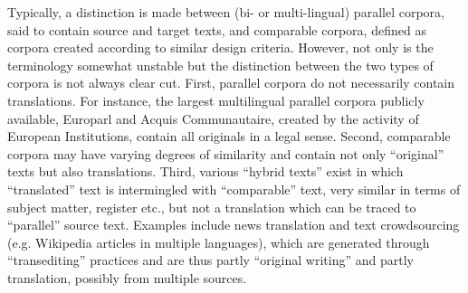 \begin{refsection}
Typically, a distinction is made between (bi- or multi-lingual) parallel corpora, said to contain source and target texts, and comparable corpora, defined as corpora created according to similar design criteria. However, not only is the terminology somewhat unstable \citep[149]{Zanettin2012} but the distinction between the two types of corpora is not always clear cut. First, parallel corpora do not necessarily contain translations. For instance, the largest multilingual parallel corpora publicly available, Europarl and Acquis Communautaire, created by the activity of European Institutions, contain all originals in a legal sense. Second, comparable corpora may have varying degrees of similarity and contain not only “original” texts but also translations. Third, various “hybrid texts” exist in which “translated” text is intermingled with “comparable” text, very similar in terms of subject matter, register etc., but not a translation which can be traced to “parallel” source text. Examples include news translation and text crowdsourcing (e.g. Wikipedia articles in multiple languages), which are generated through “transediting” \citep{Stetting1989} practices and are thus partly “original writing” and partly translation, possibly from multiple sources. 


\end{refsection}
